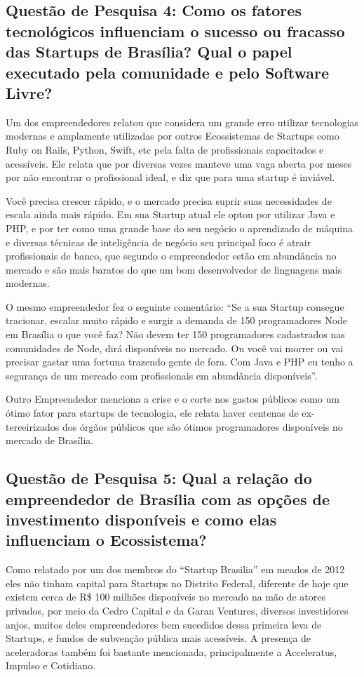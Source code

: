 \subsection{Questão de Pesquisa 4: Como os fatores tecnológicos influenciam o sucesso ou fracasso das Startups de Brasília? Qual o papel executado pela comunidade e pelo Software Livre?}
\label{subsection:pergunta_de_pesquisa_4}

Um dos empreendedores relatou que considera um grande erro utilizar tecnologias modernas e amplamente utilizadas por outros Ecossistemas de Startups como Ruby on Rails, Python, Swift, etc pela falta de profissionais capacitados e acessíveis. Ele relata que por diversas vezes manteve uma vaga aberta por meses por não encontrar o profissional ideal, e diz que para uma startup é inviável. 

Você precisa crescer rápido, e o mercado precisa suprir suas necessidades de escala ainda mais rápido. Em sua Startup atual ele optou por utilizar Java e PHP, e por ter como uma grande base do seu negócio o aprendizado de máquina e diversas técnicas de inteligência de negócio seu principal foco é atrair profissionais de banco, que segundo o empreendedor estão em abundância no mercado e são mais baratos do que um bom desenvolvedor de linguagens mais modernas. 

O mesmo empreendedor fez o seguinte comentário: ``Se a sua Startup consegue tracionar, escalar muito rápido e surgir a demanda de 150 programadores Node em Brasília o que você faz? Não devem ter 150 programadores cadastrados nas comunidades de Node, dirá disponíveis no mercado. Ou você vai morrer ou vai precisar gastar uma fortuna trazendo gente de fora. Com Java e PHP eu tenho a segurança de um mercado com profissionais em abundância disponíveis''.

Outro Empreendedor menciona a crise e o corte nos gastos públicos como um ótimo fator para startups de tecnologia, ele relata haver centenas de ex-terceirizados dos órgãos públicos que são ótimos programadores disponíveis no mercado de Brasília.

\subsection{Questão de Pesquisa 5: Qual a relação do empreendedor de Brasília com as opções de investimento disponíveis e como elas influenciam o Ecossistema?}
\label{subsection:pergunta_de_pesquisa_5}

Como relatado por um dos membros do ``Startup Brasilia'' em meados de 2012 eles não tinham capital para Startups no Distrito Federal, diferente de hoje que existem cerca de R\$ 100 milhões disponíveis no mercado na mão de atores privados, por meio da Cedro Capital e da Garan Ventures, diversos investidores anjos, muitos deles empreendedores bem sucedidos dessa primeira leva de Startups, e fundos de subvenção pública mais acessíveis. A presença de aceleradoras também foi bastante mencionada, principalmente a Acceleratus, Impulso e Cotidiano. 

